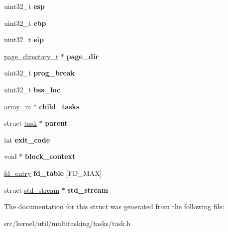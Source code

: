 \begin{DoxyCompactItemize}
uint32\+\_\+t {\bfseries esp}
\item 
\mbox{\label{structtask_a6f44e80b32d0c8f7a8fa954f6228db97}} 
uint32\+\_\+t {\bfseries ebp}
\item 
\mbox{\label{structtask_a85be201e7055bac8b2b784b33989896c}} 
uint32\+\_\+t {\bfseries eip}
\item 
\mbox{\label{structtask_afd0d4d57f6e6cf0781b31c77af6cfadd}} 
\hyperlink{structpage__directory}{page\+\_\+directory\+\_\+t} $\ast$ {\bfseries page\+\_\+dir}
\item 
\mbox{\label{structtask_a416ae3d0f5dd166d8557ea5dfb3ed6d4}} 
uint32\+\_\+t {\bfseries prog\+\_\+break}
\item 
\mbox{\label{structtask_a159f0ff918ba7f58534a978a1d2830f7}} 
uint32\+\_\+t {\bfseries bss\+\_\+loc}
\item 
\mbox{\label{structtask_a15427d4eaab0f7bf6cd150a23265697d}} 
\hyperlink{structarray__m}{array\+\_\+m} $\ast$ {\bfseries child\+\_\+tasks}
\item 
\mbox{\label{structtask_a34c6613744820a1e8127756fb6a5392c}} 
struct \hyperlink{structtask}{task} $\ast$ {\bfseries parent}
\item 
\mbox{\label{structtask_a7bdea2e1b4866892cbb0221721fdb79b}} 
int {\bfseries exit\+\_\+code}
\item 
\mbox{\label{structtask_aad04ee923594394226b0fc3e2038c9ad}} 
void $\ast$ {\bfseries block\+\_\+context}
\item 
\mbox{\label{structtask_a667966ddf53f9a9cbb707189654f42b8}} 
\hyperlink{structfd__entry}{fd\+\_\+entry} {\bfseries fd\+\_\+table} \mbox{[}F\+D\+\_\+\+M\+AX\mbox{]}
\item 
\mbox{\label{structtask_ab6942aa3abb7738252aaa2417c5d7fbc}} 
struct \hyperlink{structstd__stream}{std\+\_\+stream} $\ast$ {\bfseries std\+\_\+stream}
\end{DoxyCompactItemize}


The documentation for this struct was generated from the following file\+:\begin{DoxyCompactItemize}
\item 
src/kernel/util/multitasking/tasks/task.\+h\end{DoxyCompactItemize}
